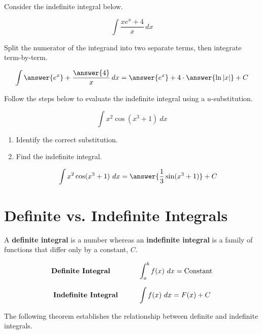 \documentclass{ximera}
\begin{document}
\begin{problem}
Consider the indefinite integral below.

\[
\int \frac{x e^x + 4}{x} \, dx
\]

Split the numerator of the integrand into two separate terms, then integrate term-by-term.


\[ \int  \answer{e^x} + \frac{\answer{4}}{x} \, dx  = \answer{e^x} + 4 \cdot \answer{\ln|x|} + C  \]


\end{problem}



\begin{problem}
Follow the steps below to evaluate the indefinite integral using a $u$-substitution.

\[ \int x^2 \cos(x^3 + 1) \ dx \] 

\begin{enumerate}
\item Identify the correct substitution.

\begin{multipleChoice}
\end{multipleChoice}

\item Find the indefinite integral.

\[ \int x^2 \cos(x^3 + 1) \ dx = \answer{\frac{1}{3}\sin(x^3 + 1)} + C \]

\end{enumerate}
\end{problem}




\section*{Definite vs. Indefinite Integrals}

A \textbf{definite integral} is a number whereas an \textbf{indefinite integral} is a family of functions that differ only by a constant, $C.$


\[ \textbf{Definite Integral} \hspace{0.55in}  \int_a^b f(x) \ dx = \textrm{Constant} \]

\[ \textbf{Indefinite Integral} \hspace{0.4in}  \int f(x) \ dx = F(x) + C \]


The following theorem establishes the relationship between definite and indefinite integrals.
\end{document}
